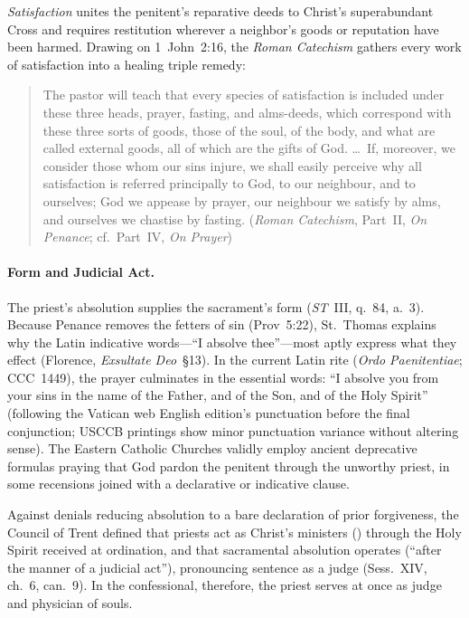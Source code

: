 \emph{Satisfaction} unites the penitent's reparative deeds to Christ's superabundant Cross and requires restitution wherever a neighbor's goods or reputation have been harmed. Drawing on 1~John~2:16, the \emph{Roman Catechism} gathers every work of satisfaction into a healing triple remedy:
\begin{quotation}
The pastor will teach that every species of satisfaction is included under these three heads, prayer, fasting, and alms-deeds, which correspond with these three sorts of goods, those of the soul, of the body, and what are called external goods, all of which are the gifts of God. \ldots\ If, moreover, we consider those whom our sins injure, we shall easily perceive why all satisfaction is referred principally to God, to our neighbour, and to ourselves; God we appease by prayer, our neighbour we satisfy by alms, and ourselves we chastise by fasting. (\emph{Roman Catechism}, Part~II, \emph{On Penance}; cf.\ Part~IV, \emph{On Prayer})
\end{quotation}

\paragraph{Form and Judicial Act.}
The priest's absolution supplies the sacrament's form (\emph{ST}~III, q.~84, a.~3). Because Penance removes the fetters of sin (Prov~5:22), St.~Thomas explains why the Latin indicative words---``I absolve thee''---most aptly express what they effect (Florence, \emph{Exsultate Deo}~\S13). In the current Latin rite (\emph{Ordo Paenitentiae}; CCC~1449), the prayer culminates in the essential words: ``I absolve you from your sins in the name of the Father, and of the Son, and of the Holy Spirit'' (following the Vatican web English edition's punctuation before the final conjunction; USCCB printings show minor punctuation variance without altering sense). The Eastern Catholic Churches validly employ ancient deprecative formulas praying that God pardon the penitent through the unworthy priest, in some recensions joined with a declarative or indicative clause.

Against denials reducing absolution to a bare declaration of prior forgiveness, the Council of Trent defined that priests act as Christ's ministers () through the Holy Spirit received at ordination, and that sacramental absolution operates  (``after the manner of a judicial act''), pronouncing sentence as a judge (Sess.~XIV, ch.~6, can.~9). In the confessional, therefore, the priest serves at once as judge and physician of souls.

